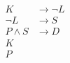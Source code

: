 \documentclass[preview,border=4pt]{standalone}
\begin{document}
\begin{align*}
        K &\rightarrow \neg L\\
        \neg L &\rightarrow S\\
        P \land S &\rightarrow D\\
        K\\
        P
      \end{align*}
\end{document}
